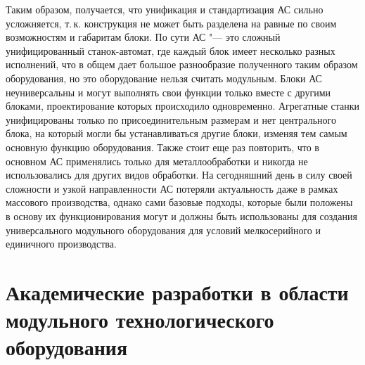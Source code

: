 Таким образом, получается, что унификация и стандартизация АС сильно усложняется, т.\,к. конструкция не может быть разделена на равные по своим возможностям и габаритам блоки. По сути АС "--- это сложный унифицированный станок-автомат, где каждый блок имеет несколько разных исполнений, что в общем дает большое разнообразие полученного таким образом оборудования, но это оборудование нельзя считать модульным. Блоки АС неуниверсальны и могут выполнять свои функции только вместе с другими блоками, проектирование которых происходило одновременно. Агрегатные станки унифицированы только по присоединительным размерам и нет центрального блока, на который могли бы устанавливаться другие блоки, изменяя тем самым основную функцию оборудования. Также стоит еще раз повторить, что в основном АС применялись только для металлообработки и никогда не использовались для других видов обработки. На сегодняшний день в силу своей сложности и узкой направленности АС потеряли актуальность даже в рамках массового производства, однако сами базовые подходы, которые были положены в основу их функционирования могут и должны быть использованы для создания универсального модульного оборудования для условий мелкосерийного и единичного производства.

\section{Академические разработки в области модульного технологического оборудования} 

